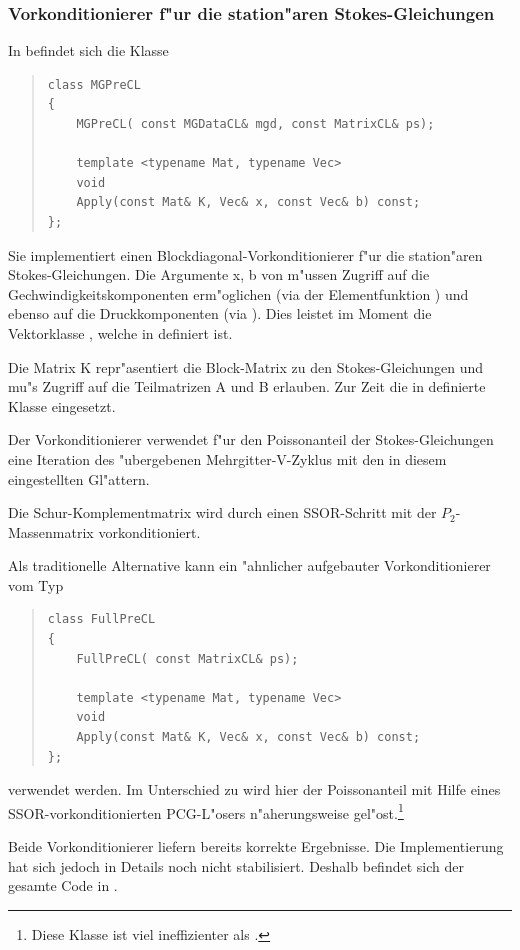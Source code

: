 \documentclass[11pt,a4paper]{article}
\newenvironment{Code}{\begin{quote}\scriptsize}{\end{quote}}
\begin{document}
\subsubsection{Vorkonditionierer f"ur die station"aren Stokes-Gleichungen}
In  befindet sich die Klasse
\begin{Code}
\begin{verbatim}
class MGPreCL
{
    MGPreCL( const MGDataCL& mgd, const MatrixCL& ps);

    template <typename Mat, typename Vec>
    void
    Apply(const Mat& K, Vec& x, const Vec& b) const;
};
\end{verbatim}
\end{Code}
Sie implementiert einen Blockdiagonal-Vorkonditionierer f"ur die
station"aren Stokes-Gleichungen.  Die Argumente x, b von 
m"ussen Zugriff auf die Gechwindigkeitskomponenten erm"oglichen (via
der Elementfunktion ) und ebenso auf die Druckkomponenten (via
). Dies leistet im Moment die Vektorklasse ,
welche in  definiert ist.

Die Matrix K repr"asentiert die Block-Matrix zu den Stokes-Gleichungen
und mu"s Zugriff auf die Teilmatrizen A und B erlauben. Zur Zeit die
in  definierte Klasse 
eingesetzt.

Der Vorkonditionierer verwendet f"ur den Poissonanteil der
Stokes-Gleichungen eine Iteration des "ubergebenen Mehrgitter-V-Zyklus
mit den in diesem eingestellten Gl"attern.

Die Schur-Komplementmatrix wird durch einen SSOR-Schritt mit der
$P_2$-Massenmatrix vorkonditioniert.

\medskip
Als traditionelle Alternative kann ein "ahnlicher aufgebauter
Vorkonditionierer vom Typ
\begin{Code}
\begin{verbatim}
class FullPreCL
{
    FullPreCL( const MatrixCL& ps);

    template <typename Mat, typename Vec>
    void
    Apply(const Mat& K, Vec& x, const Vec& b) const;
};
\end{verbatim}
\end{Code}
verwendet werden. Im Unterschied zu  wird hier der
Poissonanteil mit Hilfe eines SSOR-vorkonditionierten PCG-L"osers
n"aherungsweise gel"ost.\footnote{Diese Klasse ist viel ineffizienter
als .}

\medskip
Beide Vorkonditionierer liefern bereits korrekte Ergebnisse. Die Implementierung
hat sich jedoch in Details noch nicht stabilisiert. Deshalb befindet sich der
gesamte Code in .
\end{document}
